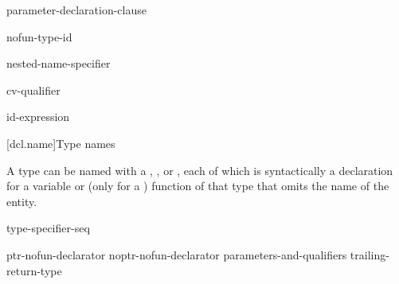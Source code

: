 \begin{bnf}
\br
    \terminal{(} parameter-declaration-clause \terminal{)} \br
    \bnfindent{}  
\end{bnf}

\begin{bnf}
\br
    \terminal{->} nofun-type-id
\end{bnf}

\begin{bnf}
\br
    \terminal{*}  \br
    \terminal{\&} \br
    \terminal{\&\&} \br
    nested-name-specifier \terminal{*}  
\end{bnf}

\begin{bnf}
\br
    cv-qualifier 
\end{bnf}

\begin{bnf}
\br
    \br
\end{bnf}

\begin{bnf}
\br
    \terminal{\&}\br
    \terminal{\&\&}
\end{bnf}

\begin{bnf}
\br
     id-expression
\end{bnf}

[dcl.name]{Type names}

\pnum
{}%
%
A type can be named with a
,
, or
,
each of
which is syntactically a declaration for a variable or
(only for a ) function
of that type that omits the name of the entity.

\begin{bnf}
\br
    type-specifier-seq 
\end{bnf}

\begin{bnf}
\br
    ptr-nofun-declarator\br
    noptr-nofun-declarator parameters-and-qualifiers trailing-return-type
\end{bnf}

